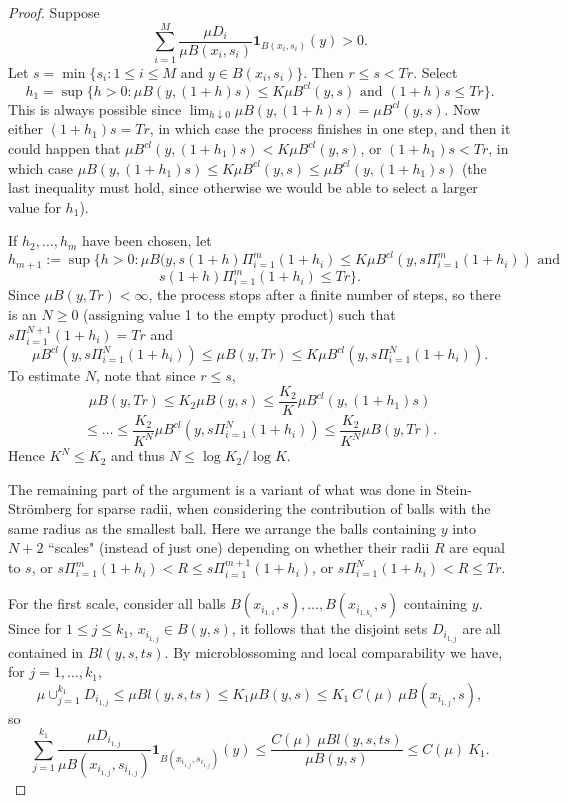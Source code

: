\documentclass[12pt]{amsart}
\theoremstyle{definition}
\theoremstyle{parrafo}
\begin{document}
 \begin{proof} Suppose 
 $$\sum_{i=1}^M\frac{\mu D_i}{\mu B(x_{i}, s_{i})}\mathbf{1}_{B(x_{i}, s_{i})} (y) > 0.
 $$
 Let $s = \min \{s_i: 1 \le i \le M \mbox{ and } y\in B(x_{i}, s_{i})\}$.  Then
 $r \le s < Tr$. Select 
 $$h_1 = \sup \{h > 0 : \mu B(y , (1 + h) s) 
 \le K \mu B^{cl} (y ,s) \mbox{ \ and \ }   (1 + h) s \le  T r\}.
 $$
 This is always possible since $ \lim_{h\downarrow 0}\mu B(y , (1 + h) s) 
 = \mu B^{cl} (y ,s) $.
Now either $(1 + h_1) s =  T r$, in which case the process finishes in one step, and then it could happen
 that
 $\mu B^{cl}(y , (1 + h_1) s) 
 < K \mu B^{cl} (y ,s)$, or $(1 + h_1) s <  T r$, in which case  $\mu B(y , (1 + h_1) s) 
 \le K \mu B^{cl} (y ,s) \le \mu B^{cl}(y , (1 + h_1) s)$  (the last inequality must hold, since otherwise we would be able to select a larger
 value for $h_1$).

 If $h_2, \dots, h_m$ have been chosen, let 
$$h_{m + 1}
 :=  
 \sup \{h > 0 : \mu B(y , s (1 + h)\Pi_{i=1}^m (1 + h_i) \le K \mu B^{cl} (y , s \Pi_{i=1}^m (1 + h_i) )
 \mbox{ \ and \ } 
 $$
 $$
s  (1 + h)\Pi_{i=1}^m (1 + h_i)  \le T r\}.$$
 Since $\mu  B (y , Tr)  < \infty$, the process stops after a finite number of steps, so
  there is an $N \ge 0$ (assigning value 1 to the empty product) such that $ s \Pi_{i=1}^{N + 1} (1 + h_i) = T r$ and
 $$
 \mu  B^{cl} (y , s \Pi_{i=1}^N (1 + h_i) ) \le \mu  B (y , Tr) \le K \mu  B^{cl} (y , s \Pi_{i=1}^N (1 + h_i) ).
 $$
 To estimate $N$, note that since $r \le s$, 
 $$
 \mu B (y , T r) \le K_2 \mu  B (y , s) \le \frac{K_2}{K}   \mu  B^{cl} (y ,(1 + h_1) s) 
 $$
 $$
 \le \dots
 \le   \frac{K_2}{K^N} \mu  B^{cl} (y , s \Pi_{i=1}^N (1 + h_i) ) 
  \le   \frac{K_2}{K^N} \mu  B (y , T r). 
  $$
  Hence $K^N \le K_2$ and thus $N\le \log K_2/ \log K$.

The remaining part of the argument is a variant of what was done in   
Stein-Str\"omberg  for sparse radii, when considering the contribution of balls with the
same radius as the smallest ball. Here we arrange the balls containing $y$  into $N + 2$ ``scales"
(instead of just one) 
depending on whether their radii $R$ are equal to $s$, or $s \Pi_{i=1}^m (1 + h_i) < R \le s \Pi_{i=1}^{m +1} (1 + h_i) $,
or $ s \Pi_{i=1}^N (1 + h_i)  < R \le T r$.

For the first scale, consider all balls 
$B(x_{i_{1,1}}, s), \dots, B(x_{i_{1,k_1}}, s)$ containing $y$. Since for $1\le j \le k_1$, 
$x_{i_{1,j}}  \in B(y, s)$, it follows that the disjoint sets $D_{i_{1,j}}$  are all contained in 
  $Bl(y, s, t s).$
By microblossoming and local comparability we have, for $j = 1, \dots, k_1$,
$$
\mu \cup_{j= 1}^{k_1}  D_{i_{1,j}}\le \mu Bl(y, s, t s) \le  
K_1 \mu B(y, s)\le  K_1 \  C(\mu) \  \mu B(x_{i_{1,j}}, s),
$$ 
so
$$
\sum_{j= 1}^{k_1} \frac{\mu D_{i_{1,j}}}{\mu B(x_{i_{1,j}}, s_{i_{1,j}})}\mathbf{1}_{B(x_{i_{1,j}}, s_{i_{1,j}})} (y)
\le
\frac{ C(\mu) \ \mu Bl(y, s, t s)}{\mu B(y, s)}
\le C(\mu)  \ K_1.
 $$
 

\end{proof}
\end{document}
